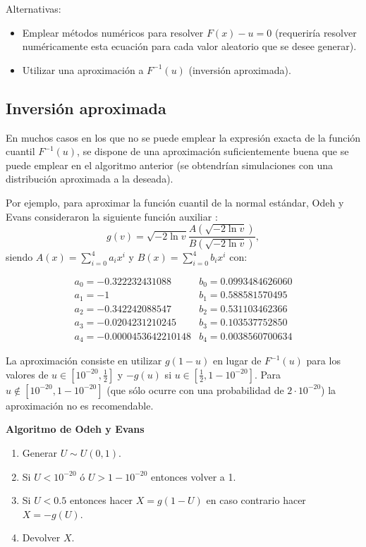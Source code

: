 \documentclass[]{book}
\theoremstyle{definition}
\theoremstyle{definition}
\theoremstyle{definition}
\theoremstyle{remark}
\begin{document}
Alternativas:

\begin{itemize}
\item
  Emplear métodos numéricos para resolver \(F\left( x\right) -u=0\)
  (requeriría resolver numéricamente esta ecuación para cada valor
  aleatorio que se desee generar).
\item
  Utilizar una aproximación a \(F^{-1}\left( u\right)\) (inversión
  aproximada).
\end{itemize}

\subsection{Inversión aproximada}\label{inversion-aproximada}

En muchos casos en los que no se puede emplear la expresión exacta de la
función cuantil \(F^{-1}\left( u\right)\), se dispone de una
aproximación suficientemente buena que se puede emplear en el algoritmo
anterior (se obtendrían simulaciones con una distribución aproximada a
la deseada).

Por ejemplo, para aproximar la función cuantil de la normal estándar,
Odeh y Evans consideraron la siguiente función auxiliar :
\[ g\left( v\right)  =\sqrt{-2\ln v}\frac{A\left( \sqrt{-2\ln v}\right)
}{B\left( \sqrt{-2\ln v}\right)  },\] siendo
\(A\left( x\right) =\sum_{i=0}^{4}a_{i}x^{i}\) y
\(B\left( x\right) =\sum_{i=0}^{4}b_{i}x^{i}\) con:

\[\begin{array}{ll}
a_{0}=-0.322232431088 &  b_{0}=0.0993484626060 \\
a_{1}=-1 &  b_{1}=0.588581570495 \\
a_{2}=-0.342242088547 & b_{2}=0.531103462366 \\
a_{3}=-0.0204231210245 & b_{3}=0.103537752850 \\
a_{4}=-0.0000453642210148 & b_{4}=0.0038560700634
\end{array}\]

La aproximación consiste en utilizar \(g\left( 1-u\right)\) en lugar de
\(F^{-1}\left( u\right)\) para los valores de \(u\in[10^{-20},\frac12]\)
y \(-g\left( u\right)\) si \(u\in[\frac12,1-10^{-20}]\). Para
\(u\notin [10^{-20},1-10^{-20}]\) (que sólo ocurre con una probabilidad
de \(2\cdot10^{-20}\)) la aproximación no es recomendable.

\textbf{Algoritmo de Odeh y Evans}

\begin{enumerate}
\def\labelenumi{\arabic{enumi}.}
\item
  Generar \(U\sim U\left( 0,1\right)\).
\item
  Si \(U<10^{-20}\) ó \(U>1-10^{-20}\) entonces volver a 1.
\item
  Si \(U<0.5\) entonces hacer \(X=g\left(1-U\right)\) en caso contrario
  hacer \(X=-g\left( U\right)\).
\item
  Devolver \(X\).
\end{enumerate}
\end{document}
